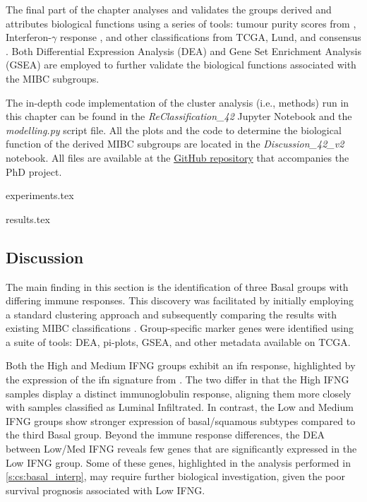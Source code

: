 The final part of the chapter analyses and validates the groups derived and attributes biological functions using a series of tools: tumour purity scores from \citet{Yoshihara2013-wq}, Interferon-$\gamma$ response \citet{Baker2022-bj}, and other classifications from TCGA, Lund, and consensus \citet{Robertson2017-mg,Marzouka2018-ge,Kamoun2020-tj}. Both Differential Expression Analysis (DEA) and Gene Set Enrichment Analysis (GSEA) are employed to further validate the biological functions associated with the MIBC subgroups.

The in-depth code implementation of the cluster analysis (i.e., methods) run in this chapter can be found in the \textit{ReClassification\_42} Jupyter Notebook and the \textit{modelling.py} script file. All the plots and the code to determine the biological function of the derived MIBC subgroups are located in the \textit{Discussion\_42\_v2} notebook. All files are available at the \href{https://github.com/vladUng/Phd_thesis_exp}{GitHub repository} that accompanies the PhD project.



{experiments.tex}

{results.tex}

\subsection{Discussion}

The main finding in this section is the identification of three Basal groups with differing immune responses. This discovery was facilitated by initially employing a standard clustering approach and subsequently comparing the results with existing MIBC classifications \citet{Baker2022-bj,Marzouka2018-ge}. Group-specific marker genes were identified using a suite of tools: DEA, pi-plots, GSEA, and other metadata available on TCGA.

Both the High and Medium IFNG groups exhibit an \acrshort{ifn} response, highlighted by the expression of the \acrshort{ifn} signature from \citet{Baker2022-bj}. The two differ in that the High IFNG samples display a distinct immunoglobulin response, aligning them more closely with samples classified as Luminal Infiltrated. In contrast, the Low and Medium IFNG groups show stronger expression of basal/squamous subtypes compared to the third Basal group. Beyond the immune response differences, the DEA between Low/Med IFNG reveals few genes that are significantly expressed in the Low IFNG group. Some of these genes, highlighted in the analysis performed in \cref{s:cs:basal_interp}, may require further biological investigation, given the poor survival prognosis associated with Low IFNG.

